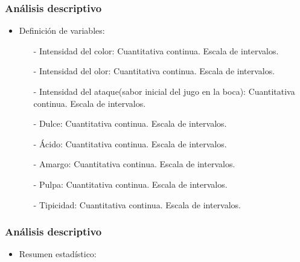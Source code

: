 \documentclass[12pt]{beamer}
\begin{document}
\begin{frame}
\frametitle{Análisis descriptivo}
\begin{itemize}
\item Definición de variables:
\begin{itemize}
\item[-]Intensidad del color: Cuantitativa continua. Escala de intervalos.
\item[-]Intensidad del olor: Cuantitativa continua. Escala de intervalos.
\item[-]Intensidad del ataque(sabor inicial del jugo en la boca): Cuantitativa continua. Escala de intervalos.
\item[-]Dulce: Cuantitativa continua. Escala de intervalos.
\item[-]Ácido: Cuantitativa continua. Escala de intervalos.
\item[-]Amargo: Cuantitativa continua. Escala de intervalos.
\item[-]Pulpa: Cuantitativa continua. Escala de intervalos.
\item[-]Tipicidad: Cuantitativa continua. Escala de intervalos.
\end{itemize}
\end{itemize}
\end{frame}


\begin{frame}
\frametitle{Análisis descriptivo}
\begin{itemize}
\item Resumen estadístico:
\end{itemize}
\begin{center}
\end{center}
\end{frame}
\end{document}
